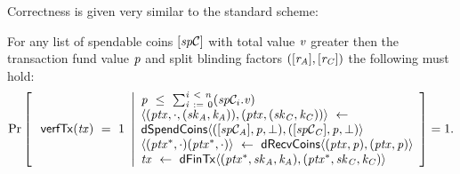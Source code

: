 Correctness is given very similar to the standard scheme:

\begin{definition}
    \label{def:atom:ext-tx-scheme-correctness}
    For any list of spendable coins $[\mathit{sp}\mathcal{C}]$ with total value $\mathit{v}$ greater then the transaction fund value $\mathit{p}$ and split blinding factors $([\mathit{r}_{\mathit{A}}], [\mathit{r}_{\mathit{C}}])$ the following must hold:
    \[
        \Pr\left[
        \begin{array}{c}
            \: \mathsf{verfTx}(\mathit{tx}) ~=~ 1
        \end{array}
        \middle\vert
        \begin{array}{l}
            \mathit{p} ~\leq~ \sum_{\mathit{i} ~:=~ 0}^{\mathit{i} ~<~ \mathit{n}}(\mathit{sp}\mathcal{C}_{i}.\mathit{v}) \\
            \langle (\mathit{ptx}, \cdot, (\mathit{sk}_{\mathit{A}}, \mathit{\mathit{k}_{\mathit{A}}})), (\mathit{ptx}, (\mathit{sk}_{\mathit{C}}, \mathit{\mathit{k}_{\mathit{C}}})) \rangle ~\leftarrow~ \\
            \mathsf{dSpendCoins} \langle ([\mathit{sp}\mathcal{C}_{\mathit{A}}],\mathit{p},\bot), ([\mathit{sp}\mathcal{C}_{\mathit{C}}],\mathit{p},\bot) \rangle \\
            \langle (\mathit{ptx}^*, \cdot)(\mathit{ptx}^*, \cdot) \rangle ~\leftarrow~ \mathsf{dRecvCoins} \langle(\mathit{ptx},\mathit{p}), (\mathit{ptx},\mathit{p}) \rangle \\
            \mathit{tx} ~\leftarrow~ \mathsf{dFinTx} \langle(\mathit{ptx}^*,\mathit{sk}_{\mathit{A}},\mathit{\mathit{k}_{\mathit{A}}}),(\mathit{ptx}^*,\mathit{sk}_{\mathit{C}},\mathit{\mathit{k}_{\mathit{C}}})\rangle
        \end{array}
        \right]=1.
    \]
\end{definition}

